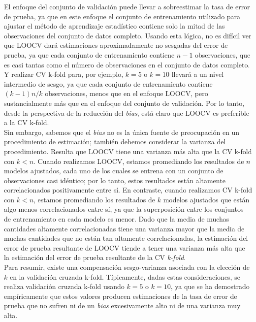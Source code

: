 El enfoque del conjunto de validación puede llevar a sobreestimar la tasa de error de prueba, ya que en este enfoque el conjunto de entrenamiento utilizado para ajustar el método de aprendizaje estadístico contiene solo la mitad de las observaciones del conjunto de datos completo. Usando esta lógica, no es difícil ver que LOOCV dará estimaciones aproximadamente no sesgadas del error de prueba, ya que cada conjunto de entrenamiento contiene $n-1$ observaciones, que es casi tantas como el número de observaciones en el conjunto de datos completo. Y realizar CV k-fold para, por ejemplo, $k = 5$ o $k = 10$ llevará a un nivel intermedio de sesgo, ya que cada conjunto de entrenamiento contiene $(k-1)n/k$ observaciones, menos que en el enfoque LOOCV, pero sustancialmente más que en el enfoque del conjunto de validación. Por lo tanto, desde la perspectiva de la reducción del \textit{bias}, está claro que LOOCV es preferible a la CV k-fold. \\

Sin embargo, sabemos que el \textit{bias} no es la única fuente de preocupación en un procedimiento de estimación; también debemos considerar la varianza del procedimiento. Resulta que LOOCV tiene una varianza más alta que la CV k-fold con $k < n$. Cuando realizamos LOOCV, estamos promediando los resultados de $n$ modelos ajustados, cada uno de los cuales se entrena con un conjunto de observaciones casi idéntico; por lo tanto, estos resultados están altamente correlacionados positivamente entre sí. En contraste, cuando realizamos CV k-fold con $k < n$, estamos promediando los resultados de $k$ modelos ajustados que están algo menos correlacionados entre sí, ya que la superposición entre los conjuntos de entrenamiento en cada modelo es menor. Dado que la media de muchas cantidades altamente correlacionadas tiene una varianza mayor que la media de muchas cantidades que no están tan altamente correlacionadas, la estimación del error de prueba resultante de LOOCV tiende a tener una varianza más alta que la estimación del error de prueba resultante de la CV \textit{k-fold}. \\

Para resumir, existe una compensación sesgo-varianza asociada con la elección de $k$ en la validación cruzada k-fold. Típicamente, dadas estas consideraciones, se realiza validación cruzada k-fold usando $k = 5$ o $k = 10$, ya que se ha demostrado empíricamente que estos valores producen estimaciones de la tasa de error de prueba que no sufren ni de un \textit{bias} excesivamente alto ni de una varianza muy alta.

